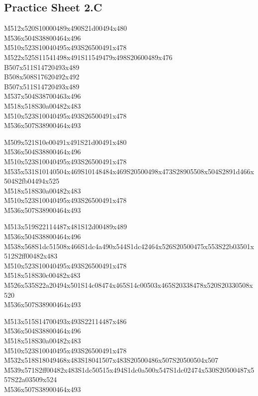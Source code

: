\documentclass{article}
\begin{document}
\subsection{Practice Sheet 2.C}

\begin{multicols}{5}
\begin{center}
M512x520S10000489x490S21d00494x480 %
\\M536x504S38800464x496 %
\\M510x523S10040495x493S26500491x478 %
\\M522x525S11541498x491S11549479x498S20600489x476 %
\\B507x511S14720493x489 %
\\B508x508S17620492x492 %
\\B507x511S14720493x489 %
\\M537x504S38700463x496 %
\\M518x518S30a00482x483 %
\\M510x523S10040495x493S26500491x478 %
\\M536x507S38900464x493 %
\vfil
\columnbreak

M509x521S10e00491x491S21d00491x480 %
\\M536x504S38800464x496 %
\\M510x523S10040495x493S26500491x478 %
\\M535x531S10140504x469S10148484x469S20500498x473S28905508x504S2891d466x504S2fb04494x525 %
\\M518x518S30a00482x483 %
\\M510x523S10040495x493S26500491x478 %
\\M536x507S38900464x493 %
\vfil
\columnbreak

M513x519S22114487x481S12d00489x489 %
\\M536x504S38800464x496 %
\\M538x568S1dc51508x466S1dc4a490x544S1dc42464x526S20500475x553S22b03501x512S2ff00482x483 %
\\M510x523S10040495x493S26500491x478 %
\\M518x518S30c00482x483 %
\\M526x535S22a20494x501S14c08474x465S14c00503x465S20338478x520S20330508x520 %
\\M536x507S38900464x493 %
\vfil
\columnbreak

M513x515S14700493x493S22114487x486 %
\\M536x504S38800464x496 %
\\M518x518S30a00482x483 %
\\M510x523S10040495x493S26500491x478 %
\\M532x518S18049468x483S18041507x483S20500486x507S20500504x507 %
\\M539x571S2ff00482x483S1dc50515x494S1dc0a500x547S1dc02474x530S20500487x557S22a03509x524 %
\\M536x507S38900464x493 %
\vfil
\columnbreak


\end{center}
\end{multicols}
\end{document}
